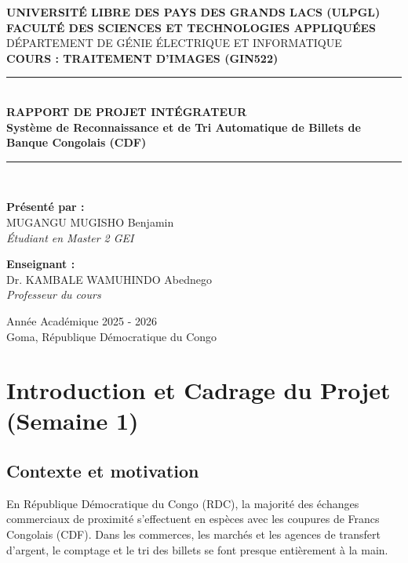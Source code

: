 \documentclass[11pt,a4paper]{article}
\begin{document}
\begin{titlepage}
    \centering
    \vspace*{1cm}
    {\large \textbf{UNIVERSITÉ LIBRE DES PAYS DES GRANDS LACS (ULPGL)}}\\[0.3cm]
    {\large \textbf{FACULTÉ DES SCIENCES ET TECHNOLOGIES APPLIQUÉES}}\\[0.2cm]
    {\normalsize DÉPARTEMENT DE GÉNIE ÉLECTRIQUE ET INFORMATIQUE}\\[2cm]

    {\large \textbf{COURS : TRAITEMENT D'IMAGES (GIN522)}}\\[1cm]

    \rule{\linewidth}{0.5mm}\\[0.4cm]
    {\huge \textbf{RAPPORT DE PROJET INTÉGRATEUR}}\\[0.3cm]
    {\Large \textbf{Système de Reconnaissance et de Tri Automatique de Billets de Banque Congolais (CDF)}}\\[0.2cm]
    \rule{\linewidth}{0.5mm}\\[2.5cm]

    \begin{minipage}{0.45\textwidth}
        \textbf{Présenté par :}\\
        MUGANGU MUGISHO Benjamin\\
        \textit{Étudiant en Master 2 GEI}
    \end{minipage}
    \hfill
    \begin{minipage}{0.45\textwidth}
        \begin{flushright}
            \textbf{Enseignant :}\\
            Dr. KAMBALE WAMUHINDO Abednego\\
            \textit{Professeur du cours}
        \end{flushright}
    \end{minipage}

    \vfill
    {\normalsize Année Académique 2025 - 2026}\\[0.5cm]
    {\small Goma, République Démocratique du Congo}
\end{titlepage}

\newpage
\tableofcontents
\newpage

\section{Introduction et Cadrage du Projet (Semaine 1)}

\subsection{Contexte et motivation}
En République Démocratique du Congo (RDC), la majorité des échanges commerciaux de proximité s'effectuent en espèces avec les coupures de Francs Congolais (CDF). Dans les commerces, les marchés et les agences de transfert d'argent, le comptage et le tri des billets se font presque entièrement à la main.
\end{document}
